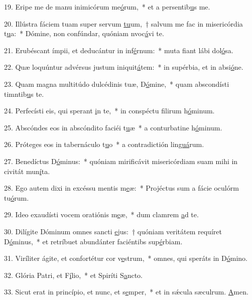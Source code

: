 19. Eripe me de manu inimicórum me\uline{ó}rum,~* et a persentib\uline{u}s me.\par 
20. Illústra fáciem tuam super servum \uline{tu}um,~† salvum me fac in misericórdia t\uline{u}a:~* Dómine, non confúndar, quóniam nvoc\uline{á}vi te.\par 
21. Erubéscant ímpii, et deducántur in inf\uline{é}rnum:~* muta fiant lábi dol\uline{ó}sa.\par 
22. Quæ loquúntur advérsus justum iniquit\uline{á}tem:~* in supérbia, et in absi\uline{ó}ne.\par 
23. Quam magna multitúdo dulcédinis tuæ, D\uline{ó}mine,~* quam abscondísti timntib\uline{u}s te.\par 
24. Perfecísti eis, qui sperant \uline{i}n te,~* in conspéctu filirum h\uline{ó}minum.\par 
25. Abscóndes eos in abscóndito faciéi t\uline{u}æ~* a conturbatine h\uline{ó}minum.\par 
26. Próteges eos in tabernáculo t\uline{u}o~* a contradictión lin\uline{guá}rum.\par 
27. Benedíctus D\uline{ó}minus:~* quóniam mirificávit misericórdiam suam mihi in civitát mun\uline{í}ta.\par 
28. Ego autem dixi in excéssu mentis m\uline{e}æ:~* Projéctus sum a fácie oculórm tu\uline{ó}rum.\par 
29. Ideo exaudísti vocem oratiónis m\uline{e}æ,~* dum clamrem \uline{a}d te.\par 
30. Dilígite Dóminum omnes sancti \uline{e}jus:~† quóniam veritátem requíret D\uline{ó}minus,~* et retríbuet abundánter faciéntibs sup\uline{é}rbiam.\par 
31. Viríliter ágite, et confortétur cor v\uline{e}strum,~* omnes, qui speráts in D\uline{ó}mino.\par 
32. Glória Patri, et F\uline{í}lio,~* et Spiríti S\uline{a}ncto.\par 
33. Sicut erat in princípio, et nunc, et s\uline{e}mper,~* et in sǽcula sæculrum. \uline{A}men.\par 
